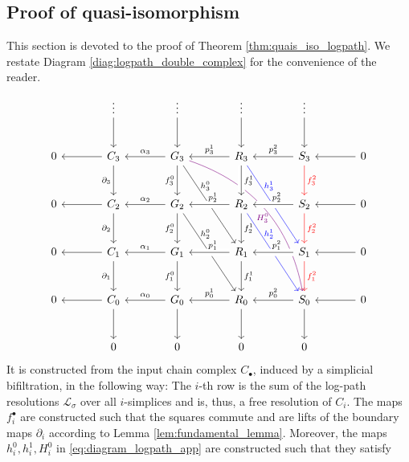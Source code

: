 \subsection{Proof of quasi-isomorphism}
\label{app:quasiiso_logpath}
%
This section is devoted to the proof of Theorem \ref{thm:quais_iso_logpath}. We restate Diagram \ref{diag:logpath_double_complex} for the convenience of the reader.
\begin{equation} \label{eq:diagram_logpath_app}
\begin{tikzcd} [column sep=large,row sep=large]
& \vdots \arrow[d] & \vdots \arrow[d] & \vdots \arrow[d] & \vdots \arrow[d] \\
0 & C_3 \arrow[l] \arrow[d,swap,"\partial_3"] & G_3 \arrow[l,swap,"\alpha_3"] \arrow[d,swap,"f_3^0"] \arrow[ddr,"h_3^0"{xshift=-10pt,yshift=10pt}] \arrow[dddrr,violet,bend left,"H_3^0"{xshift=-10pt,yshift=-14pt}] & R_3 \arrow[l,swap,"p_3^1"] \arrow[d,crossing over,"f_3^1"] \arrow[ddr,blue,"h_3^1"{xshift=-10pt,yshift=10pt}] & S_3 \arrow[l,swap,"p^2_3"] \arrow[d,red,"f_3^2"] & 0 \arrow[l] \\
0 & C_2 \arrow[l] \arrow[d,swap,"\partial_2"] & G_2 \arrow[l,swap,"\alpha_2"] \arrow[d,swap,"f_2^0"] \arrow[ddr,"h_2^0"{xshift=-10pt,yshift=10pt}] & R_2 \arrow[l,swap,"p_2^1"{xshift=3pt},crossing over] \arrow[d,"f_2^1"] \arrow[ddr,blue,"h_2^1"{xshift=-10pt,yshift=10pt}] & S_2 \arrow[l,swap,"p^2_2"{xshift=3pt},crossing over] \arrow[d,red,"f_2^2"] & 0 \arrow[l] \\
0 & C_1 \arrow[l] \arrow[d,swap,"\partial_1"] & G_1 \arrow[l,swap,"\alpha_1"] \arrow[d,swap,"f_1^0"] & R_1 \arrow[l,swap,"p_1^1"{xshift=3pt},crossing over] \arrow[d,"f_1^1"] & S_1 \arrow[l,swap,"p^2_1"{xshift=3pt},crossing over] \arrow[d,red,"f_1^2"] & 0 \arrow[l] \\
0 & C_0 \arrow[l] \arrow[d] & G_0 \arrow[l,swap,"\alpha_0"] \arrow[d] & R_0 \arrow[l,swap,"p_0^1"] \arrow[d] & S_0 \arrow[l,swap,"p^2_0"] \arrow [d]& 0 \arrow[l] \\
& 0 & 0 & 0 & 0
\end{tikzcd}
\end{equation} 
%
It is constructed from the input chain complex $C_\bullet$, induced by a simplicial bifiltration, in the following way: The $i$-th row is the sum of the log-path resolutions $\mathcal{L}_\sigma$ over all $i$-simplices and is, thus, a free resolution of $C_i$. The maps $f_i^\bullet$ are constructed such that the squares commute and are lifts of the boundary maps $\partial_i$ according to Lemma \ref{lem:fundamental_lemma}. Moreover, the maps $h^0_i,h^1_i,H^0_i$ in \eqref{eq:diagram_logpath_app} are constructed such that they satisfy
